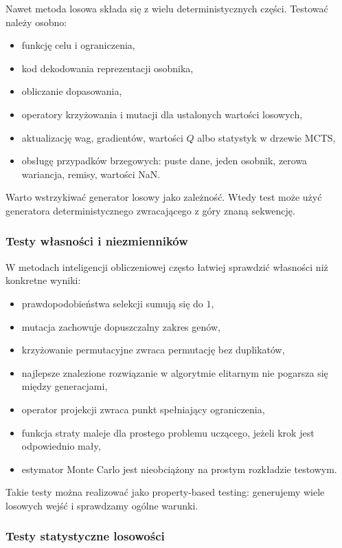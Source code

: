 Nawet metoda losowa składa się z wielu deterministycznych części. Testować należy osobno:
\begin{itemize}
  \item funkcję celu i ograniczenia,
  \item kod dekodowania reprezentacji osobnika,
  \item obliczanie dopasowania,
  \item operatory krzyżowania i mutacji dla ustalonych wartości losowych,
  \item aktualizację wag, gradientów, wartości $Q$ albo statystyk w drzewie MCTS,
  \item obsługę przypadków brzegowych: puste dane, jeden osobnik, zerowa wariancja, remisy, wartości NaN.
\end{itemize}

Warto wstrzykiwać generator losowy jako zależność. Wtedy test może użyć generatora deterministycznego zwracającego z góry znaną sekwencję.

\subsubsection{Testy własności i niezmienników}

W metodach inteligencji obliczeniowej często łatwiej sprawdzić własności niż konkretne wyniki:
\begin{itemize}
  \item prawdopodobieństwa selekcji sumują się do $1$,
  \item mutacja zachowuje dopuszczalny zakres genów,
  \item krzyżowanie permutacyjne zwraca permutację bez duplikatów,
  \item najlepsze znalezione rozwiązanie w algorytmie elitarnym nie pogarsza się między generacjami,
  \item operator projekcji zwraca punkt spełniający ograniczenia,
  \item funkcja straty maleje dla prostego problemu uczącego, jeżeli krok jest odpowiednio mały,
  \item estymator Monte Carlo jest nieobciążony na prostym rozkładzie testowym.
\end{itemize}

Takie testy można realizować jako property-based testing: generujemy wiele losowych wejść i sprawdzamy ogólne warunki.

\subsubsection{Testy statystyczne losowości}

